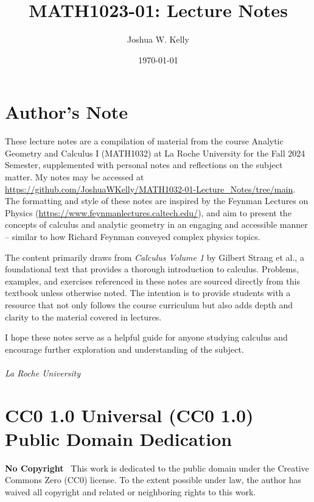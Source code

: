 \documentclass{book}
\title{MATH1023-01: Lecture Notes} %
\author{Joshua W. Kelly} %
\date{\today} %
\begin{document}
\maketitle %


\section*{Author's Note} %
These lecture notes are a compilation of material from the course Analytic Geometry and Calculus I (MATH1032) at La Roche University for the Fall 2024 Semester, supplemented with personal notes and reflections on the subject matter. My notes may be accessed at \\ \url{https://github.com/JoshuaWKelly/MATH1032-01-Lecture_Notes/tree/main}. The formatting and style of these notes are inspired by the Feynman Lectures on Physics (\url{https://www.feynmanlectures.caltech.edu/}), and aim to present the concepts of calculus and analytic geometry in an engaging and accessible manner -- similar to how Richard Feynman conveyed complex physics topics.

The content primarily draws from \textit{Calculus Volume 1} by Gilbert Strang et al.\cite{strang_calculus_2016}, a foundational text that provides a thorough introduction to calculus. Problems, examples, and exercises referenced in these notes are sourced directly from this textbook unless otherwise noted. The intention is to provide students with a resource that not only follows the course curriculum but also adds depth and clarity to the material covered in lectures.

I hope these notes serve as a helpful guide for anyone studying calculus and encourage further exploration and understanding of the subject.\\

 \\
\textit{La Roche University} \\ 

\newpage

\vfill

\section*{CC0 1.0 Universal (CC0 1.0) Public Domain Dedication}

\textbf{No Copyright}  
\faCreativeCommons~This work is dedicated to the public domain under the Creative Commons Zero (CC0) license. To the extent possible under law, the author has waived all copyright and related or neighboring rights to this work. 
\end{document}
